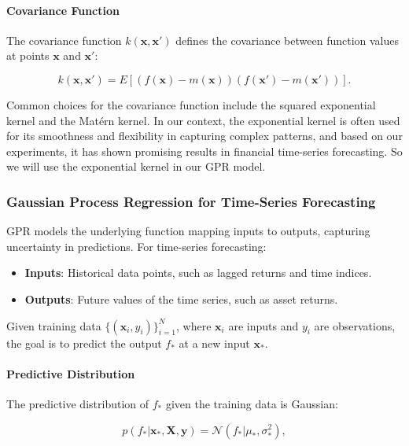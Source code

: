 \paragraph{Covariance Function}

The covariance function $k(\mathbf{x}, \mathbf{x}')$ defines the covariance between function values at points $\mathbf{x}$ and $\mathbf{x}'$:

\begin{equation}
    k(\mathbf{x}, \mathbf{x}') = E\left[ (f(\mathbf{x}) - m(\mathbf{x}))(f(\mathbf{x}') - m(\mathbf{x}')) \right].
\end{equation}

Common choices for the covariance function include the squared exponential kernel and the Matérn kernel. 
In our context, the exponential kernel is often used for its smoothness and flexibility in capturing complex patterns, and based on our experiments, it has shown promising results in financial time-series forecasting.
So we will use the exponential kernel in our GPR model.

\subsubsection{Gaussian Process Regression for Time-Series Forecasting}

GPR models the underlying function mapping inputs to outputs, capturing uncertainty in predictions. For time-series forecasting:

\begin{itemize}
    \item \textbf{Inputs}: Historical data points, such as lagged returns and time indices.
    \item \textbf{Outputs}: Future values of the time series, such as asset returns.
\end{itemize}

Given training data $\{ (\mathbf{x}_i, y_i) \}_{i=1}^N$, where $\mathbf{x}_i$ are inputs and $y_i$ are observations, the goal is to predict the output $f_*$ at a new input $\mathbf{x}_*$.

\paragraph{Predictive Distribution}

The predictive distribution of $f_*$ given the training data is Gaussian:

\begin{equation}
    p(f_* | \mathbf{x}_*, \mathbf{X}, \mathbf{y}) = \mathcal{N}\left( f_* | \mu_*, \sigma_*^2 \right),
\end{equation}

